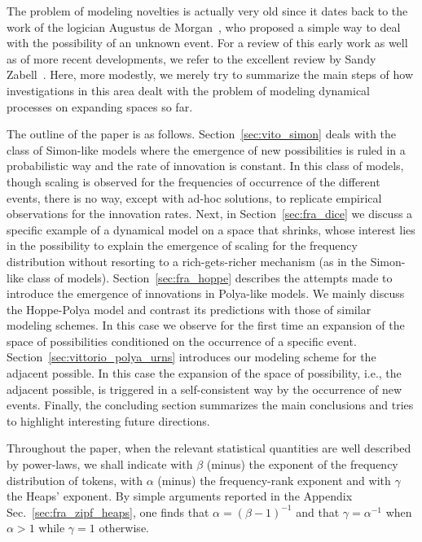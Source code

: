 \documentclass[graybox]{svmult}
\begin{document}
The problem of modeling novelties is actually very old since it dates back to the work of the logician Augustus de Morgan~\cite{De_Morgan_1838}, who proposed a simple way to deal with the possibility of an unknown event. For a review of this early work as well as of more recent developments, we refer to the excellent review by Sandy Zabell~\cite{Zabell_1992}. Here, more modestly, we merely try to summarize the main steps of how investigations in this area dealt with the problem of modeling dynamical processes on expanding spaces so far. 

The outline of the paper is as follows. Section~\ref{sec:vito_simon} deals with the class of Simon-like models where the emergence of new possibilities is ruled in a probabilistic way and the rate of innovation is constant. In this class of models, though scaling is observed for the frequencies of occurrence of the different events, there is no way, except with ad-hoc solutions, to replicate empirical observations for the innovation rates. Next, in Section~\ref{sec:fra_dice} we discuss a specific example of a dynamical model on a space that shrinks, whose interest lies in the possibility to explain the emergence of scaling for the frequency distribution without resorting to a rich-gets-richer mechanism (as in the Simon-like class of models). Section~\ref{sec:fra_hoppe} describes the attempts made to introduce the emergence of innovations in Polya-like models. We mainly discuss the Hoppe-Polya model and contrast its predictions with those of similar modeling schemes. In this case we observe for the first time 
an expansion of the space of possibilities conditioned on the occurrence of a specific event. Section~\ref{sec:vittorio_polya_urns} introduces our modeling scheme for the adjacent possible. In this case the expansion of the space of possibility, i.e., the adjacent possible, is triggered in a self-consistent way by the occurrence of new events. Finally, the concluding section summarizes the main conclusions and tries to highlight interesting future directions. 

Throughout the paper, when the relevant statistical quantities are well described by power-laws, we shall indicate with $\beta$ (minus) the exponent of the frequency distribution of tokens, with $\alpha$ (minus) the frequency-rank exponent and with $\gamma$ the Heaps' exponent. By simple arguments reported in the Appendix Sec.~\ref{sec:fra_zipf_heaps}, one finds that $\alpha = (\beta-1)^{-1}$ and that $\gamma=\alpha^{-1}$ when $\alpha>1$ while $\gamma=1$ otherwise.
\end{document}

